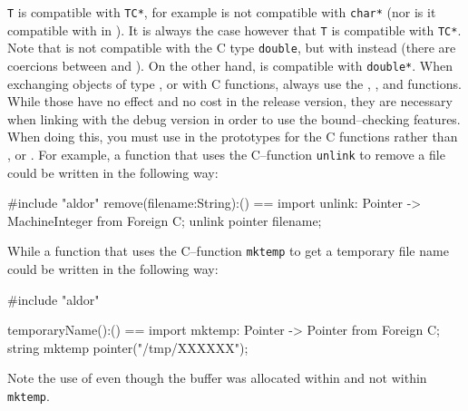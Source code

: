  {\tt T} is compatible with {\tt TC*}, for
example   is not compatible
with {\tt char*} (nor is it compatible with  in \libaldor).
It is always the case however that  {\tt T}
is compatible with {\tt TC*}.
Note that  is not compatible with
the C type {\tt double}, but with
 instead (there are coercions between
 and ).
On the other hand,  
is compatible with {\tt double*}.
When exchanging objects of type ,
 or 
with C functions, always use the ,
,  and
 functions. While those have no effect and
no cost in the release version, they are necessary when linking with
the debug version in order to use the bound--checking features.
When doing this, you must use  in the prototypes for
the C functions rather than ,
 or .
For example, a function that uses the C--function {\tt unlink} to
remove a file could be written in the following way:
\begin{ttyout}
#include "aldor"
remove(filename:String):() == {
	import { unlink: Pointer -> MachineInteger } from Foreign C;
	unlink pointer filename;
}
\end{ttyout}
\noindent
While a function that uses the C--function {\tt mktemp} to get a
temporary file name could be written in the following way:
\begin{ttyout}
#include "aldor"

temporaryName():() == {
	import { mktemp: Pointer -> Pointer } from Foreign C;
	string mktemp pointer("/tmp/XXXXXX");
}
\end{ttyout}
\noindent
Note the use of  even though the buffer was
allocated within \libaldor{} and not within {\tt mktemp}.

